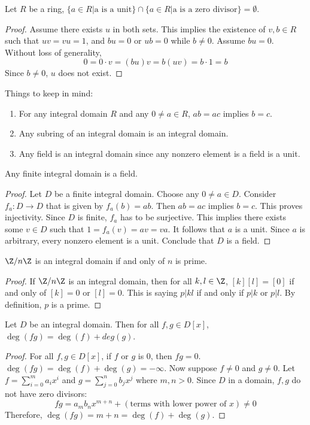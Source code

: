 \documentclass[10pt]{article}
\begin{document}
\begin{lemma}
    Let $R$ be a ring, $\{a\in R|\text{a is a unit}\}\cap\{a\in R|\text{a is a zero divisor}\}=\emptyset$.
\end{lemma}
\begin{proof}
    Assume there exists $u$ in both sets. This implies the existence of $v, b\in R$ such that $uv=vu=1$, and $bu=0$ or $ub=0$ while $b\neq 0$. Assume $bu=0$. Without loss of generality,
    $$
        0=0\cdot v=(bu)v=b(uv)=b\cdot 1=b
    $$
    Since $b\neq 0$, $u$ does not exist.
\end{proof}
\begin{remark}
    Things to keep in mind:
    \begin{enumerate}
        \item For any integral domain $R$ and any $0\neq a\in R$, $ab=ac$ implies $b=c$. 
        \item Any subring of an integral domain is an integral domain. 
        \item Any field is an integral domain since any nonzero element is a field is a unit.
    \end{enumerate}
\end{remark}
\begin{lemma}
    Any finite integral domain is a field.
\end{lemma}
\begin{proof}
    Let $D$ be a finite integral domain. Choose any $0\neq a\in D$. Consider $f_a:D\to D$ that is given by $f_a(b)=ab$. Then $ab=ac$ implies $b=c$. This proves {injectivity}. Since $D$ is finite, $f_a$ has to be {surjective}. This implies there exists some $v\in D$ such that $1=f_a(v)=av=va$. It follows that $a$ is a unit. Since $a$ is arbitrary, every nonzero element is a unit. Conclude that $D$ is a field.
\end{proof}
\begin{lemma}
    $\Z/n\Z$ is an integral domain if and only of $n$ is prime.
\end{lemma}
\begin{proof}
    If $\Z/n\Z$ is an integral domain, then for all $k, l\in \Z$, $[k][l]=[0]$ if and only of $[k]=0$ or $[l]=0$. This is saying $p|kl$ if and only if $p|k$ or $p|l$. By definition, $p$ is a prime.
\end{proof}
\begin{proposition}
    Let $D$ be an integral domain. Then for all $f, g\in D[x]$, $\deg(fg)=\deg(f)+deg(g)$.
\end{proposition}
\begin{proof}
    For all $f, g\in D[x]$, if $f$ or $g$ is 0, then $fg = 0$. $\deg(fg) = \deg(f) + \deg(g)=-\infty$. Now suppose $f\neq0$ and $g\neq0$. Let $f=\sum_{i=0}^{m}a_{i}x^{i}$ and $g = \sum_{j=0}^{n}b_{j}x^{j}$ where $m,n>0$. Since $D$ in a domain, $f,g$ do not have zero divisors:
    $$
        fg = a_{m}b_{n}x^{m+n} + (\text{terms with lower power of }x) \neq 0
    $$
    Therefore, $\deg(fg) = m+n = \deg(f) + \deg(g)$.
\end{proof}
\end{document}
